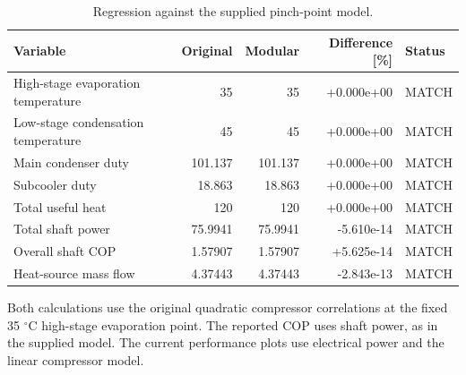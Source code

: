 \begin{table}[htbp]
\centering
\caption{Regression against the supplied pinch-point model.}
\label{tab:julio_model_regression}
\small
\begin{tabular}{lrrrl}
\hline
\textbf{Variable} & \textbf{Original} & \textbf{Modular} & \textbf{Difference [\%]} & \textbf{Status} \\
\hline
High-stage evaporation temperature & 35 & 35 & +0.000e+00 & MATCH \\
Low-stage condensation temperature & 45 & 45 & +0.000e+00 & MATCH \\
Main condenser duty & 101.137 & 101.137 & +0.000e+00 & MATCH \\
Subcooler duty & 18.863 & 18.863 & +0.000e+00 & MATCH \\
Total useful heat & 120 & 120 & +0.000e+00 & MATCH \\
Total shaft power & 75.9941 & 75.9941 & -5.610e-14 & MATCH \\
Overall shaft COP & 1.57907 & 1.57907 & +5.625e-14 & MATCH \\
Heat-source mass flow & 4.37443 & 4.37443 & -2.843e-13 & MATCH \\
\hline
\end{tabular}

\vspace{1.5mm}
\begin{minipage}{0.98\linewidth}
\footnotesize
Both calculations use the original quadratic compressor correlations at the fixed 35 $^{\circ}$C high-stage evaporation point. The reported COP uses shaft power, as in the supplied model. The current performance plots use electrical power and the linear compressor model.
\end{minipage}
\end{table}
